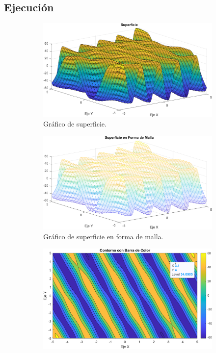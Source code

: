 \documentclass[a4paper, 12pt]{article}
\begin{document}
        \subsection{Ejecución}
	\begin{figure}[ht]
		\begin{subfigure}{0.49\textwidth}
			\centering
			\includegraphics[width=\textwidth]{figures/graf5.1.png}
			\caption{Gráfico de superficie.}
			\label{grafica5.1}
		\end{subfigure}
		\begin{subfigure}{0.49\textwidth}
			\centering
			\includegraphics[width=\textwidth]{figures/graf5.2.png}
			\caption{Gráfico de superficie en forma de malla.}
			\label{grafica5.2}
		\end{subfigure}
		\begin{subfigure}{0.49\textwidth}
			\centering
			\includegraphics[width=\textwidth]{figures/graf5.3.png}

\end{subfigure}
\end{figure}
\end{document}
